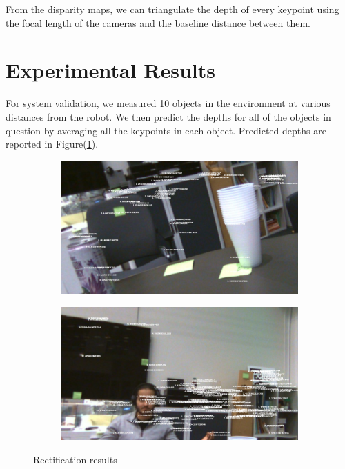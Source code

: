 \documentclass[12pt,letterpaper]{article}
\begin{document}
From the disparity maps, we can triangulate the depth of every keypoint using the focal length of the cameras and the baseline distance between them.

\section{Experimental Results}

For system validation, we measured 10 objects in the environment at various distances from the robot. We then predict the depths for all of the objects in question by averaging all the keypoints in each object. Predicted depths are reported in Figure(\ref{depth_results}).

\begin{figure}[htb]
	\centering
	\begin{subfigure}[c]{0.4\linewidth} 
		\includegraphics[width=\linewidth]{./images/depth_results_8.png}
		\subcaption{}
	\end{subfigure}
	\begin{subfigure}[c]{0.4\linewidth}
		\includegraphics[width=\linewidth]{./images/depth_results2_9.png}
		\subcaption{}
	\end{subfigure}
	\caption{Rectification results}
	\label{depth_results}
\end{figure}
\end{document}
